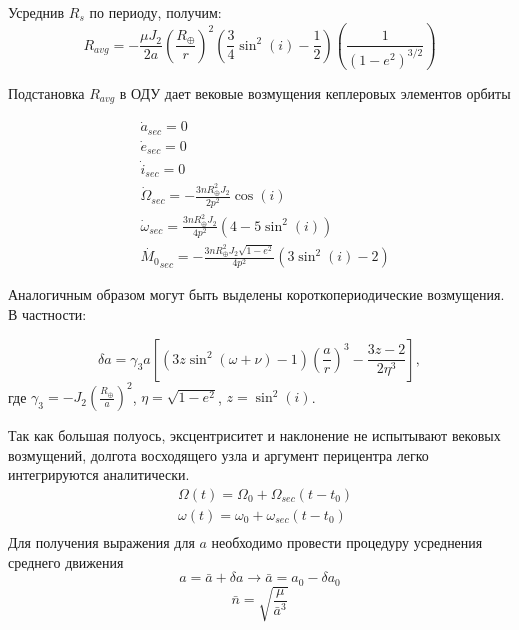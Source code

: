 Усреднив $R_s$ по периоду, получим:
\begin{equation*}
    R_{avg} =  - \frac{\mu J_2}{2 a} \left( \frac{R_\oplus}{r} \right)^2 
                \left( \frac{3}{4} \sin^2(i) - \frac{1}{2} \right)
                \left( \frac{1}{(1 - e^2)^{3/2}} \right)
\end{equation*}

Подстановка $R_{avg}$ в ОДУ дает вековые возмущения кеплеровых элементов орбиты

\begin{align*}
    & \dot{a}_{sec} = 0 \\
    & \dot{e}_{sec} = 0 \\
    & \dot{i}_{sec} = 0 \\
    & \dot{\Omega}_{sec} = - \frac{3 n R^{2}_\oplus J_2}{2 p^2} \cos(i) \\
    & \dot{\omega}_{sec} = \frac{3 n R^{2}_\oplus J_2}{4 p^2} (4 - 5 \sin^2(i)) \\
    & \dot{M_0}_{sec} = - \frac{3 n R^{2}_\oplus J_2 \sqrt{1 - e^2}}{4 p ^2}
                            (3 \sin^2(i) - 2)
\end{align*}

Аналогичным образом могут быть выделены короткопериодические возмущения. В частности:

\begin{equation*}
    \delta a = \gamma_3 a \left[ (3z \sin^2(\omega + \nu) - 1) \left(\frac{a}{r}\right)^3
                                    - \frac{3z - 2}{2 \eta^3}  \right],
\end{equation*}
где $\gamma_3 = -J_2 \left(\frac{R_\oplus}{a}\right)^2$, $\eta = \sqrt{1 - e^2}$, $z = \sin^2(i)$.

Так как большая полуось, эксцентриситет и наклонение не испытывают вековых возмущений, 
долгота восходящего узла и аргумент перицентра легко интегрируются аналитически.
\begin{align*}
    & \Omega(t) = \Omega_0 + \Omega_{sec} (t - t_0) \\
    & \omega(t) = \omega_0 + \omega_{sec} (t - t_0) \\
\end{align*}
Для получения выражения для $a$ необходимо провести процедуру усреднения среднего движения
\begin{equation*}
    a = \bar{a} + \delta a \rightarrow  \bar{a} = a_0 - \delta a_0
\end{equation*}
\begin{equation*}
    \bar{n} = \sqrt{\frac{\mu}{\bar{a}^3}}
\end{equation*}

